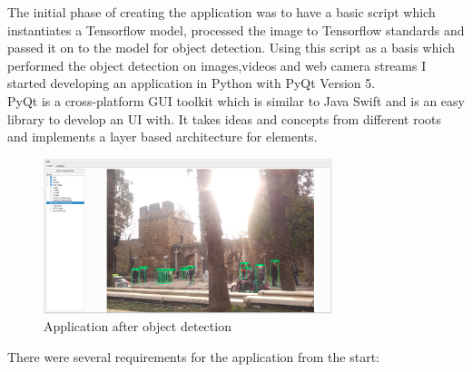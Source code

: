 
The initial phase of creating the application was to have a basic script which instantiates a Tensorflow model, processed the image to
Tensorflow standards and passed it on to the model for object detection. Using this script as a basis which performed the object detection
on images,videos and web camera streams I started developing an application in Python with PyQt Version 5.\\
PyQt is a cross-platform GUI toolkit which is similar to Java Swift and is an easy library to develop an UI with. It takes ideas and concepts
from different roots and implements a layer based architecture for elements.
\vspace{0.25cm}
\begin{figure}[H]
    \begin{center}
        \includegraphics[width=0.75\textwidth]{images/application/Application.png}
    \end{center}
    \caption{Application after object detection}
\end{figure}
\vspace{0.25cm}
There were several requirements for the application from the start:
